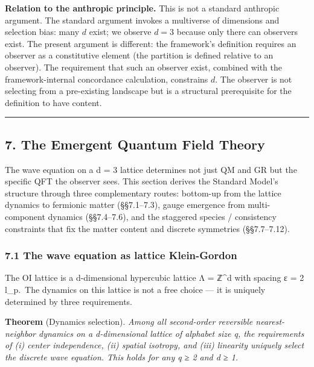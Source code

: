 \documentclass[
  11pt,
]{article}
\begin{document}
\textbf{Relation to the anthropic principle.} This is not a standard
anthropic argument. The standard argument invokes a multiverse of
dimensions and selection bias: many \(d\) exist; we observe \(d = 3\)
because only there can observers exist. The present argument is
different: the framework's definition requires an observer as a
constitutive element (the partition is defined relative to an observer).
The requirement that such an observer exist, combined with the
framework-internal concordance calculation, constrains \(d\). The
observer is not selecting from a pre-existing landscape but is a
structural prerequisite for the definition to have content.

\begin{center}\rule{0.5\linewidth}{0.5pt}\end{center}

\hypertarget{the-emergent-quantum-field-theory}{%
\subsection{7. The Emergent Quantum Field
Theory}\label{the-emergent-quantum-field-theory}}

The wave equation on a d = 3 lattice determines not just QM and GR but
the specific QFT the observer sees. This section derives the Standard
Model's structure through three complementary routes: bottom-up from the
lattice dynamics to fermionic matter (§§7.1--7.3), gauge emergence from
multi-component dynamics (§§7.4--7.6), and the staggered species /
consistency constraints that fix the matter content and discrete
symmetries (§§7.7--7.12).

\hypertarget{the-wave-equation-as-lattice-klein-gordon}{%
\subsubsection{7.1 The wave equation as lattice
Klein-Gordon}\label{the-wave-equation-as-lattice-klein-gordon}}

The OI lattice is a d-dimensional hypercubic lattice Λ = ℤ\^{}d with
spacing ε = 2 l\_p.~The dynamics on this lattice is not a free choice
--- it is uniquely determined by three requirements.

\textbf{Theorem} (Dynamics selection). \emph{Among all second-order
reversible nearest-neighbor dynamics on a d-dimensional lattice of
alphabet size q, the requirements of (i) center independence, (ii)
spatial isotropy, and (iii) linearity uniquely select the discrete wave
equation. This holds for any q ≥ 2 and d ≥ 1.}
\end{document}
